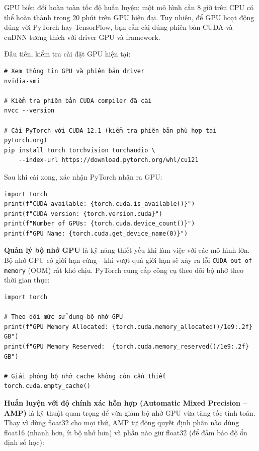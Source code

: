 GPU biến đổi hoàn toàn tốc độ huấn luyện: một mô hình cần 8 giờ trên CPU có thể hoàn thành trong 20 phút trên GPU hiện đại. Tuy nhiên, để GPU hoạt động đúng với PyTorch hay TensorFlow, bạn cần cài đúng phiên bản CUDA và cuDNN tương thích với driver GPU và framework.

Đầu tiên, kiểm tra cài đặt GPU hiện tại:

\begin{verbatim}
# Xem thông tin GPU và phiên bản driver
nvidia-smi

# Kiểm tra phiên bản CUDA compiler đã cài
nvcc --version

# Cài PyTorch với CUDA 12.1 (kiểm tra phiên bản phù hợp tại pytorch.org)
pip install torch torchvision torchaudio \
    --index-url https://download.pytorch.org/whl/cu121
\end{verbatim}

Sau khi cài xong, xác nhận PyTorch nhận ra GPU:

\begin{verbatim}
import torch
print(f"CUDA available: {torch.cuda.is_available()}")
print(f"CUDA version: {torch.version.cuda}")
print(f"Number of GPUs: {torch.cuda.device_count()}")
print(f"GPU Name: {torch.cuda.get_device_name(0)}")
\end{verbatim}

\vspace{0.5em}
\textbf{Quản lý bộ nhớ GPU} là kỹ năng thiết yếu khi làm việc với các mô hình lớn. Bộ nhớ GPU có giới hạn cứng---khi vượt quá giới hạn sẽ xảy ra lỗi \texttt{CUDA out of memory} (OOM) rất khó chịu. PyTorch cung cấp công cụ theo dõi bộ nhớ theo thời gian thực:

\begin{verbatim}
import torch

# Theo dõi mức sử dụng bộ nhớ GPU
print(f"GPU Memory Allocated: {torch.cuda.memory_allocated()/1e9:.2f} GB")
print(f"GPU Memory Reserved:  {torch.cuda.memory_reserved()/1e9:.2f} GB")

# Giải phóng bộ nhớ cache không còn cần thiết
torch.cuda.empty_cache()
\end{verbatim}

\textbf{Huấn luyện với độ chính xác hỗn hợp (Automatic Mixed Precision -- AMP)} là kỹ thuật quan trọng để vừa giảm bộ nhớ GPU vừa tăng tốc tính toán. Thay vì dùng float32 cho mọi thứ, AMP tự động quyết định phần nào dùng float16 (nhanh hơn, ít bộ nhớ hơn) và phần nào giữ float32 (để đảm bảo độ ổn định số học):

